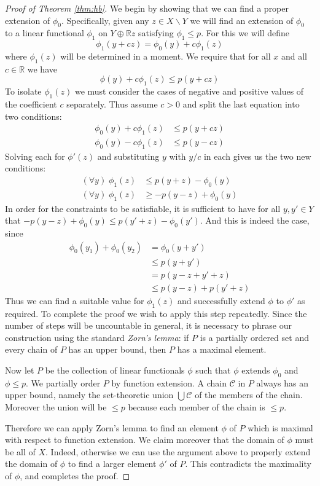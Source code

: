 \documentclass[11pt,oneside]{amsbook}
\renewcommand{\setminus}{\smallsetminus}
\newcommand{\RR}{{\mathbb R}}
\theoremstyle{definition}
\theoremstyle{plain}
\theoremstyle{definition}
\theoremstyle{remark}
\numberwithin{equation}{section}
\numberwithin{figure}{section}
\begin{document}
\begin{proof}[Proof of Theorem \ref{thm:hb}]
  We begin by showing that we can find a proper extension of $\phi_0$. Specifically, given any $z\in X\setminus Y$ we will find an extension of $\phi_0$ to a linear functional $\phi_1$ on $Y\oplus\RR z$ satisfying $\phi_1\leq p$. For this we will define
  \[\phi_1(y+cz)=\phi_0(y)+c\phi_1(z)
  \]
  where $\phi_1(z)$ will be determined in a moment. We require that for all $x$ and all $c\in\RR$ we have
  \[\phi(y)+c\phi_1(z)\leq p(y+cz)
  \]
  To isolate $\phi_1(z)$ we must consider the cases of negative and positive values of the coefficient $c$ separately. Thus assume $c>0$ and split the last equation into two conditions:
  \begin{align*}
    \phi_0(y)+c\phi_1(z)&\leq p(y+cz)\\
    \phi_0(y)-c\phi_1(z)&\leq p(y-cz)
  \end{align*}
  Solving each for $\phi'(z)$ and substituting $y$ with $y/c$ in each gives us the two new conditions:
  \begin{align*}
    (\forall y)\;\phi_1(z)&\leq p(y+z)-\phi_0(y)\\
    (\forall y)\;\phi_1(z)&\geq-p(y-z)+\phi_0(y)
  \end{align*}
  In order for the constraints to be satisfiable, it is sufficient to have for all $y,y'\in Y$ that $-p(y-z)+\phi_0(y)\leq p(y'+z)-\phi_0(y')$. And this is indeed the case, since
  \begin{align*}
    \phi_0(y_1)+\phi_0(y_2)&=\phi_0(y+y')\\
                       &\leq p(y+y')\\
                       &=p(y-z+y'+z)\\
                       &\leq p(y-z)+p(y'+z)
  \end{align*}
  Thus we can find a suitable value for $\phi_1(z)$ and successfully extend $\phi$ to $\phi'$ as required. To complete the proof we wish to apply this step repeatedly. Since the number of steps will be uncountable in general, it is necessary to phrase our construction using the standard \emph{Zorn's lemma}: if $P$ is a partially ordered set and every chain of $P$ has an upper bound, then $P$ has a maximal element.

  Now let $P$ be the collection of linear functionals $\phi$ such that $\phi$ extends $\phi_0$ and $\phi\leq p$. We partially order $P$ by function extension. A chain $\mathcal C$ in $P$ always has an upper bound, namely the set-theoretic union $\bigcup\mathcal C$ of the members of the chain. Moreover the union will be $\leq p$ because each member of the chain is $\leq p$.

  Therefore we can apply Zorn's lemma to find an element $\phi$ of $P$ which is maximal with respect to function extension. We claim moreover that the domain of $\phi$ must be all of $X$. Indeed, otherwise we can use the argument above to properly extend the domain of $\phi$ to find a larger element $\phi'$ of $P$. This contradicts the maximality of $\phi$, and completes the proof.
\end{proof}
\end{document}
